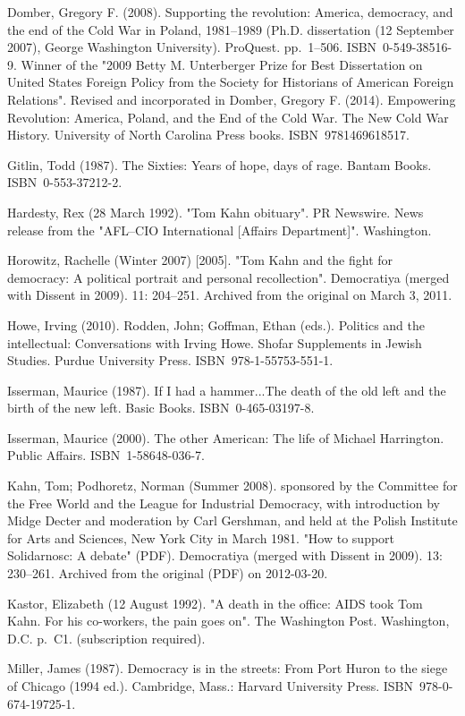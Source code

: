 Domber, Gregory F. (2008). Supporting the revolution: America,
democracy, and the end of the Cold War in Poland, 1981--1989 (Ph.D.
dissertation (12 September 2007), George Washington University).
ProQuest. pp.~1--506. ISBN~0-549-38516-9. Winner of the "2009 Betty M.
Unterberger Prize for Best Dissertation on United States Foreign Policy
from the Society for Historians of American Foreign Relations". Revised
and incorporated in Domber, Gregory F. (2014). Empowering Revolution:
America, Poland, and the End of the Cold War. The New Cold War History.
University of North Carolina Press books. ISBN~9781469618517.

Gitlin, Todd (1987). The Sixties: Years of hope, days of rage. Bantam
Books. ISBN~0-553-37212-2.

Hardesty, Rex (28 March 1992). "Tom Kahn obituary". PR Newswire. News
release from the "AFL--CIO International {[}Affairs Department{]}".
Washington.

Horowitz, Rachelle (Winter 2007) {[}2005{]}. "Tom Kahn and the fight for
democracy: A political portrait and personal recollection". Democratiya
(merged with Dissent in 2009). 11: 204--251. Archived from the original
on March 3, 2011.

Howe, Irving (2010). Rodden, John; Goffman, Ethan (eds.). Politics and
the intellectual: Conversations with Irving Howe. Shofar Supplements in
Jewish Studies. Purdue University Press. ISBN~978-1-55753-551-1.

Isserman, Maurice (1987). If I had a hammer...The death of the old left
and the birth of the new left. Basic Books. ISBN~0-465-03197-8.

Isserman, Maurice (2000). The other American: The life of Michael
Harrington. Public Affairs. ISBN~1-58648-036-7.

Kahn, Tom; Podhoretz, Norman (Summer 2008). sponsored by the Committee
for the Free World and the League for Industrial Democracy, with
introduction by Midge Decter and moderation by Carl Gershman, and held
at the Polish Institute for Arts and Sciences, New York City in March
1981. "How to support Solidarnosc: A debate" (PDF). Democratiya (merged
with Dissent in 2009). 13: 230--261. Archived from the original (PDF) on
2012-03-20.

Kastor, Elizabeth (12 August 1992). "A death in the office: AIDS took
Tom Kahn. For his co-workers, the pain goes on". The Washington Post.
Washington, D.C. p.~C1. (subscription required).

Miller, James (1987). Democracy is in the streets: From Port Huron to
the siege of Chicago (1994 ed.). Cambridge, Mass.: Harvard University
Press. ISBN~978-0-674-19725-1.

